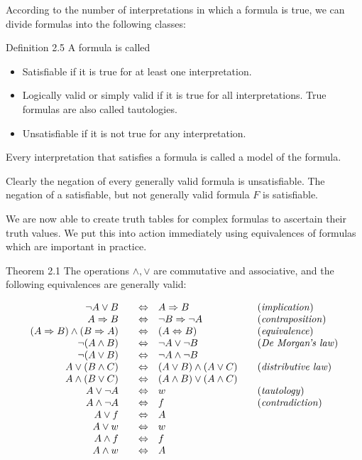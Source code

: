 \documentclass[10pt]{book}
\begin{document}
According to the number of interpretations in which a formula is true, we can divide formulas into the following classes:

Definition 2.5 A formula is called

\begin{itemize}
  \item Satisfiable if it is true for at least one interpretation.
  \item Logically valid or simply valid if it is true for all interpretations. True formulas are also called tautologies.
  \item Unsatisfiable if it is not true for any interpretation.
\end{itemize}

Every interpretation that satisfies a formula is called a model of the formula.

Clearly the negation of every generally valid formula is unsatisfiable. The negation of a satisfiable, but not generally valid formula $F$ is satisfiable.

We are now able to create truth tables for complex formulas to ascertain their truth values. We put this into action immediately using equivalences of formulas which are important in practice.

Theorem 2.1 The operations $\wedge, \vee$ are commutative and associative, and the following equivalences are generally valid:

$$
\begin{array}{rlrlrl}
\neg A \vee B & & \Leftrightarrow & A \Rightarrow B & & \text{(\textit{implication})} \\
A \Rightarrow B & & \Leftrightarrow & \neg B \Rightarrow \neg A & & \text{(\textit{contraposition})} \\
(A \Rightarrow B) \wedge(B \Rightarrow A) & & \Leftrightarrow & (A \Leftrightarrow B) & & \text{(\textit{equivalence})} \\
\neg(A \wedge B) & & \Leftrightarrow & \neg A \vee \neg B & & \text{(\textit{De Morgan's law})} \\
\neg(A \vee B) & & \Leftrightarrow & \neg A \wedge \neg B & & \\
A \vee(B \wedge C) & & \Leftrightarrow & (A \vee B) \wedge(A \vee C) & & \text{(\textit{distributive law})} \\
A \wedge(B \vee C) & & \Leftrightarrow & (A \wedge B) \vee(A \wedge C) & & \\
A \vee \neg A & & \Leftrightarrow & w & & \text{(\textit{tautology})} \\
A \wedge \neg A & & \Leftrightarrow & f & & \text{(\textit{contradiction})} \\
A \vee f & & \Leftrightarrow & A & & \\
A \vee w & & \Leftrightarrow & w & & \\
A \wedge f & & \Leftrightarrow & f & & \\
A \wedge w & & \Leftrightarrow & A & &
\end{array}
$$
\end{document}
